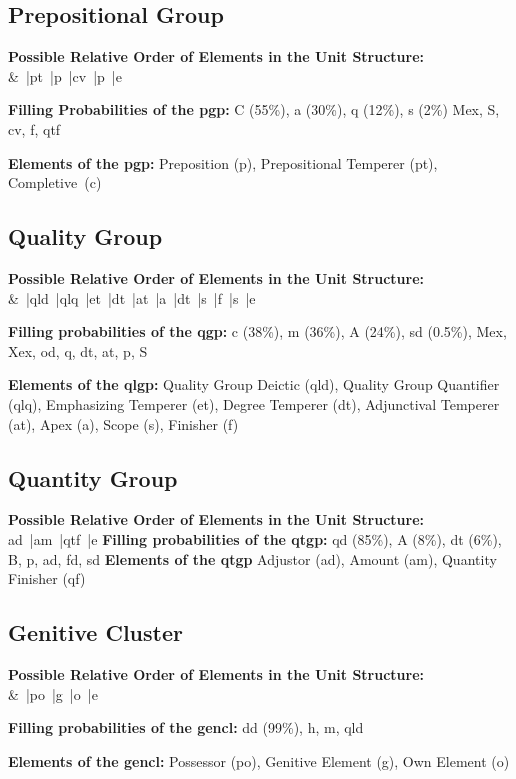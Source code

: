 \subsection{Prepositional Group}
\textbf{Possible Relative Order of Elements in the Unit Structure:} \\ \noindent
\&~|pt~|p~|cv~|p~|e

\noindent\textbf{Filling Probabilities of the pgp:} C (55\%), a (30\%), q (12\%), s (2\%) Mex, S, cv, f, qtf

\noindent\textbf{Elements of the pgp:} Preposition (p), Prepositional Temperer (pt), Completive~(c)

\subsection{Quality Group}
\textbf{Possible Relative Order of Elements in the Unit Structure:}\\ \noindent 
\&~|qld~|qlq~|et~|dt~|at~|a~|dt~|s~|f~|s~|e

\noindent\textbf{Filling probabilities of the qgp:} c (38\%), m (36\%), A (24\%), sd (0.5\%), Mex, Xex, od, q, dt, at, p, S

\noindent\textbf{Elements of the qlgp:} Quality Group Deictic (qld), Quality Group Quantifier (qlq), Emphasizing Temperer (et), Degree Temperer (dt), Adjunctival Temperer (at), Apex (a), Scope (s), Finisher (f)

\subsection{Quantity Group}
\textbf{Possible Relative Order of Elements in the Unit Structure:} \\ \noindent
ad~|am~|qtf~|e
\noindent\textbf{Filling probabilities of the qtgp:} qd (85\%), A (8\%), dt (6\%), B, p, ad, fd, sd
\noindent\textbf{Elements of the qtgp} Adjustor (ad), Amount (am), Quantity Finisher (qf)
\subsection{Genitive Cluster}
\textbf{Possible Relative Order of Elements in the Unit Structure:} \\ \noindent
\&~|po~|g~|o~|e

\noindent\textbf{Filling probabilities of the gencl:} dd (99\%), h, m, qld

\noindent\textbf{Elements of the gencl:} Possessor (po), Genitive Element (g), Own Element (o)

